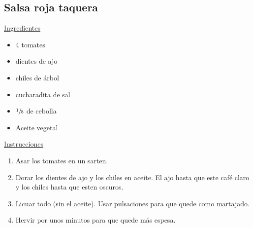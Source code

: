 \subsection{Salsa roja taquera}

\underline{Ingredientes}
\begin{itemize}
\item 4 tomates
\item {} dientes de ajo
\item {} chiles de árbol
\item {} cucharadita de sal
\item \Sim $\sfrac{1}{8}$ de cebolla
\item Aceite vegetal
\end{itemize}

\underline{Instrucciones}
\begin{enumerate}
\item Asar los tomates en un sarten.
\item Dorar los dientes de ajo y los chiles en aceite. El ajo hasta que este café claro y los chiles hasta que esten oscuros.
\item Licuar todo (sin el aceite). Usar pulsaciones para que quede como martajado.
\item Hervir por unos minutos para que quede más espesa.
\end{enumerate}
